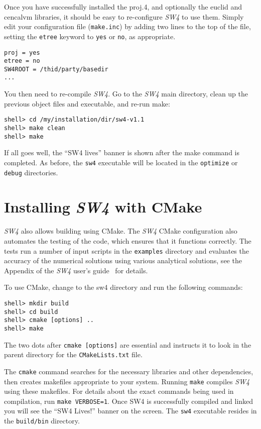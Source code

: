 \documentclass[11pt]{article}
\begin{document}
Once you have successfully installed the proj.4, and optionally the euclid and cencalvm libraries,
it should be easy to re-configure \emph{SW4} to use them. Simply edit your configuration file
(\verb+make.inc+) by adding two lines to the top of the file, setting the {\tt etree} keyword to
{\tt yes} or {\tt no}, as appropriate.
\begin{verbatim}
proj = yes
etree = no
SW4ROOT = /thid/party/basedir
...
\end{verbatim}
You then need to re-compile \emph{SW4}. Go to the \emph{SW4} main directory, clean up the previous
object files and executable, and re-run make:
\begin{verbatim}
shell> cd /my/installation/dir/sw4-v1.1
shell> make clean
shell> make
\end{verbatim}
If all goes well, the ``SW4 lives'' banner is shown after the make command is
completed. As before, the \verb+sw4+ executable will be located in the \verb+optimize+ or
\verb+debug+ directories.

\section{Installing \emph{SW4} with CMake}\label{cha:installing-cmake-sw4}
\emph{SW4} also allows building using CMake.  The \emph{SW4} CMake configuration also automates the
testing of the code, which ensures that it functions correctly. The tests run a number of input
scripts in the \verb+examples+ directory and evaluates the accuracy of the numerical solutions using
various analytical solutions, see the Appendix of the \emph{SW4} user's guide~\cite{SW4-11} for
details.

To use CMake, change to the sw4 directory and run the following commands:
\begin{verbatim}
shell> mkdir build
shell> cd build
shell> cmake [options] ..
shell> make
\end{verbatim}
The two dots after {\tt cmake [options]} are essential and instructs it to look in the parent
directory for the {\tt CMakeLists.txt} file.

The \verb+cmake+ command searches for the necessary libraries and other dependencies, then creates
makefiles appropriate to your system.  Running \verb+make+ compiles \emph{SW4} using these
makefiles.  For details about the exact commands being used in compilation, run \texttt{make
  VERBOSE=1}.  Once SW4 is successfully compiled and linked you will see the ``SW4 Lives!'' banner
on the screen. The \verb+sw4+ executable resides in the \verb+build/bin+ directory.
\end{document}
